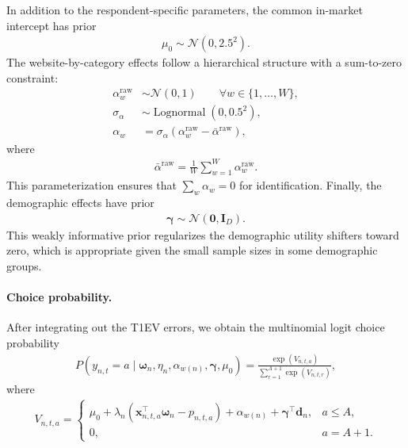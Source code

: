 \documentclass[12pt]{article}
\theoremstyle{definition}
\theoremstyle{remark}
\begin{document}
\begin{appendix}
In addition to the respondent-specific parameters, the common in-market intercept has prior
\begin{align*}
    \mu_0
    \sim
    \mathcal{N}(0,2.5^2).
\end{align*}
The website-by-category effects follow a hierarchical structure with a sum-to-zero constraint:
\begin{align*}
    \alpha_w^{\mathrm{raw}}
    &\sim
    \mathcal{N}(0,1)
    \qquad
    \forall w\in\{1,\ldots,W\},
    \\
    \sigma_{\alpha}
    &\sim
    \operatorname{Lognormal}(0,0.5^2),
    \\
    \alpha_w
    &=
    \sigma_{\alpha}
    \left(
      \alpha_w^{\mathrm{raw}}
      -
      \bar{\alpha}^{\mathrm{raw}}
    \right),
\end{align*}
where
\begin{align*}
    \bar{\alpha}^{\mathrm{raw}}
    =
    \frac{1}{W}
    \sum_{w=1}^{W}
    \alpha_w^{\mathrm{raw}}.
\end{align*}
This parameterization ensures that
$\sum_w\alpha_w=0$ for identification. Finally, the demographic effects have prior
\begin{align*}
    \boldsymbol{\gamma}
    \sim
    \mathcal{N}
    \left(
      \mathbf{0},
      \mathbf{I}_D
    \right).
\end{align*}
This weakly informative prior regularizes the demographic utility shifters toward zero, which is appropriate given the small sample sizes in some demographic groups.

\paragraph{Choice probability.}
After integrating out the T1EV errors, we obtain the multinomial logit choice probability
\begin{align*}
    P
    \left(
      y_{n,t}=a
      \mid
      \boldsymbol{\omega}_n,
      \eta_n,
      \alpha_{w(n)},
      \boldsymbol{\gamma},
      \mu_0
    \right)
    =
    \frac{
      \exp(V_{n,t,a})
    }{
      \sum_{r=1}^{A+1}
      \exp(V_{n,t,r})
    },
\end{align*}
where
\begin{align*}
    V_{n,t,a}
    =
    \begin{cases}
      \mu_0
      +
      \lambda_n
      \left(
        \bm x_{n,t,a}^{\top}\boldsymbol{\omega}_n
        -
        p_{n,t,a}
      \right)
      +
      \alpha_{w(n)}
      +
      \boldsymbol{\gamma}^{\top}\bm d_n,
      &
      a\leq A,
      \\[0.4em]
      0,
      &
      a=A+1.
    \end{cases}
\end{align*}


\end{appendix}
\end{document}
